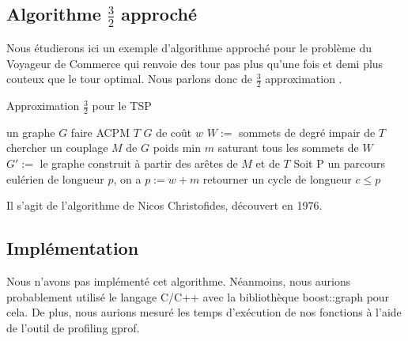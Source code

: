 \subsection{Algorithme $\frac{3}{2}$ approché}

Nous étudierons ici un exemple d'algorithme approché pour le problème du 
Voyageur de Commerce qui renvoie des tour pas plus qu'une fois et demi plus
couteux que le tour optimal. Nous parlons donc de \og $\frac{3}{2}$ approximation \fg{}.

\begin{algorithm}[!ht]
\caption{Approximation $\frac{3}{2}$ pour le TSP}
\label{3-2tsp}
\begin{algorithmic}[1]
\REQUIRE un graphe $G$
\STATE faire ACPM $T$ $G$ de coût $w$
\STATE $W := $ sommets de degré impair de $T$
\STATE chercher un couplage $M$ de $G$ poids min $m$ saturant tous les
sommets de $W$
\STATE $G' := $ le graphe construit à partir des arêtes de $M$ et de
$T$
\STATE Soit P un parcours eulérien de longueur $p$, on a $p:= w + m$
\STATE retourner un cycle de longueur $c \leq p$
\end{algorithmic}
\end{algorithm}

Il s'agit de l'algorithme de Nicos Christofides, découvert en 1976.

\subsection{Implémentation}

Nous n'avons pas implémenté cet algorithme. Néanmoins, nous aurions
probablement utilisé le langage C/C++ avec la bibliothèque
boost::graph pour cela. De plus, nous aurions mesuré les temps
d'exécution de nos fonctions à l'aide de l'outil de profiling gprof.
